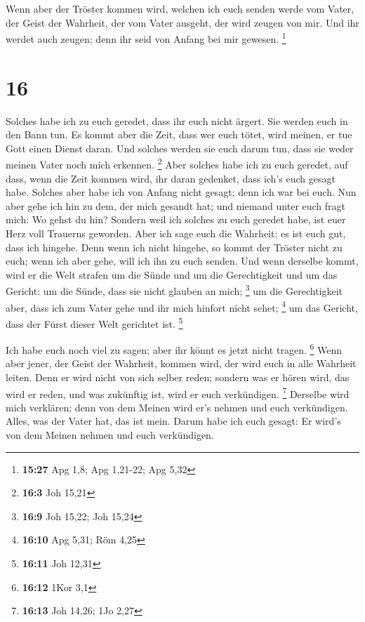  Wenn aber der Tröster kommen wird, welchen ich euch
senden werde vom Vater, der Geist der Wahrheit, der vom Vater ausgeht,
der wird zeugen von mir.  Und ihr werdet auch zeugen;
denn ihr seid von Anfang bei mir gewesen. \footnote{\textbf{15:27} Apg
  1,8; Apg 1,21-22; Apg 5,32}

\hypertarget{section-6}{%
\section{16}\label{section-6}}

 Solches habe ich zu euch geredet, dass ihr euch nicht
ärgert.  Sie werden euch in den Bann tun. Es kommt aber
die Zeit, dass wer euch tötet, wird meinen, er tue Gott einen Dienst
daran.  Und solches werden sie euch darum tun, dass sie
weder meinen Vater noch mich erkennen. \footnote{\textbf{16:3} Joh 15,21}
 Aber solches habe ich zu euch geredet, auf dass, wenn die
Zeit kommen wird, ihr daran gedenket, dass ich's euch gesagt habe.
Solches aber habe ich von Anfang nicht gesagt; denn ich war bei euch.
 Nun aber gehe ich hin zu dem, der mich gesandt hat; und
niemand unter euch fragt mich: Wo gehst du hin?  Sondern
weil ich solches zu euch geredet habe, ist euer Herz voll Trauerns
geworden.  Aber ich sage euch die Wahrheit: es ist euch
gut, dass ich hingehe. Denn wenn ich nicht hingehe, so kommt der Tröster
nicht zu euch; wenn ich aber gehe, will ich ihn zu euch senden.
 Und wenn derselbe kommt, wird er die Welt strafen um die
Sünde und um die Gerechtigkeit und um das Gericht:  um die
Sünde, dass sie nicht glauben an mich; \footnote{\textbf{16:9} Joh
  15,22; Joh 15,24}  um die Gerechtigkeit aber, dass ich
zum Vater gehe und ihr mich hinfort nicht sehet; \footnote{\textbf{16:10}
  Apg 5,31; Röm 4,25}  um das Gericht, dass der Fürst
dieser Welt gerichtet ist. \footnote{\textbf{16:11} Joh 12,31}

 Ich habe euch noch viel zu sagen; aber ihr könnt es
jetzt nicht tragen. \footnote{\textbf{16:12} 1Kor 3,1} 
Wenn aber jener, der Geist der Wahrheit, kommen wird, der wird euch in
alle Wahrheit leiten. Denn er wird nicht von sich selber reden; sondern
was er hören wird, das wird er reden, und was zukünftig ist, wird er
euch verkündigen. \footnote{\textbf{16:13} Joh 14,26; 1Jo 2,27}
 Derselbe wird mich verklären; denn von dem Meinen wird
er's nehmen und euch verkündigen.  Alles, was der Vater
hat, das ist mein. Darum habe ich euch gesagt: Er wird's von dem Meinen
nehmen und euch verkündigen.


